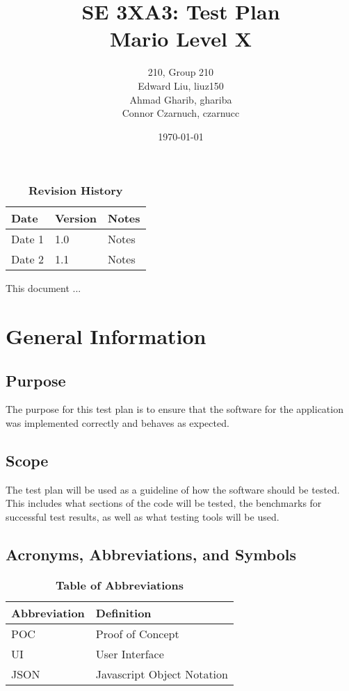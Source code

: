 \documentclass[12pt, titlepage]{article}
\title{SE 3XA3: Test Plan\\Mario Level X}
\author{210, Group 210
		\\ Edward Liu, liuz150
		\\ Ahmad Gharib, ghariba
		\\ Connor Czarnuch, czarnucc
}
\date{\today}
\begin{document}
\maketitle

\tableofcontents
\listoftables
\listoffigures

\begin{table}[bp]
\caption{\bf Revision History}
\begin{tabularx}{\textwidth}{p{3cm}p{2cm}X}
\toprule {\bf Date} & {\bf Version} & {\bf Notes}\\
\midrule
Date 1 & 1.0 & Notes\\
Date 2 & 1.1 & Notes\\
\bottomrule
\end{tabularx}
\end{table}

\newpage


This document ...

\section{General Information}

\subsection{Purpose}
The purpose for this test plan is to ensure that the software for the application was implemented correctly and behaves as expected.

\subsection{Scope}
The test plan will be used as a guideline of how the software should be tested. This includes what sections of the code will be tested, the benchmarks for successful test results, as well as what testing tools will be used.
\subsection{Acronyms, Abbreviations, and Symbols}

\begin{table}[hbp]
\caption{\textbf{Table of Abbreviations}} \label{Table}

\begin{tabularx}{\textwidth}{p{3cm}X}
\toprule
\textbf{Abbreviation} & \textbf{Definition} \\
\midrule
POC & Proof of Concept\\
UI & User Interface\\
JSON & Javascript Object Notation\\
\bottomrule
\end{tabularx}

\end{table}
\end{document}
